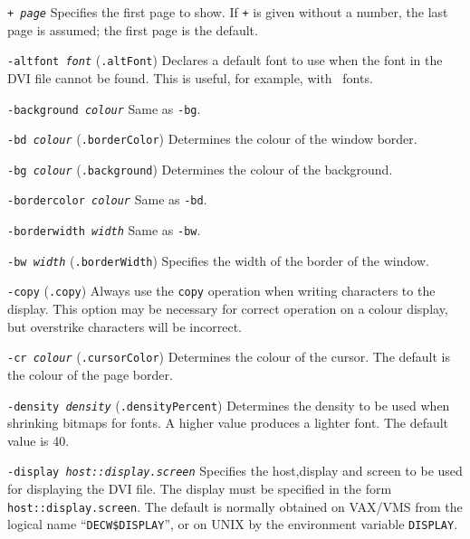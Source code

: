 \begin{list}%
{}%
{
\settowidth{\labelsep}{aaaa}
\settowidth{\rightmargin}{aaa}
\addtolength{\labelwidth}{\labelsep}
\setlength{\leftmargin}{\labelwidth}}
%
\item[\tt+ \em page]
Specifies the first page to show.  If {\tt+} is given without a
number, the last page is assumed; the first page is the default.

\item[\tt -altfont \em font]
({\tt .altFont})
Declares a default font to use when the font in the DVI file cannot be found.
This is useful, for example, with \PS\ fonts.

\item[\tt-background \em colour]
Same as {\tt-bg}.

\item[\tt-bd \em colour]
({\tt .borderColor})
Determines the colour of the window border.

\item[\tt-bg \em colour]
({\tt .background})
Determines the colour of the background.

\item[\tt-bordercolor \em colour]
Same as {\tt-bd}.

\item[\tt-borderwidth \em width]
Same as {\tt-bw}.

\item[\tt-bw \em width]
({\tt .borderWidth})
Specifies the width of the border of the window.

\item[\tt-copy]
({\tt .copy})
Always use the {\tt copy} operation when writing characters to the display.
This option may be necessary for correct operation on a colour display, but
overstrike characters will be incorrect.

\item[\tt-cr \em colour]
({\tt .cursorColor})
Determines the colour of the cursor.  The default is the colour of the page
border.

\item[\tt-density \em density]
({\tt .densityPercent})
Determines the density to be used when shrinking bitmaps for fonts.
A higher value produces a lighter font.  The default value is 40.

\item[\tt-display \em host::display.screen]
Specifies the host,display and screen to be used for displaying the DVI file.
The display must be specified in the form {\tt host::display.screen}.
The default is normally obtained on VAX/VMS from the logical name 
``{\tt DECW\$DISPLAY}'', or on UNIX by the environment variable \verb+DISPLAY+.



\end{list}
